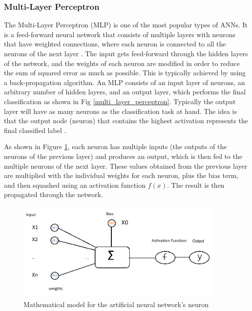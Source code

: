 \documentclass[extern,palatino]{cgMA}
\begin{document}
\subsubsection{Multi-Layer Perceptron} 

The Multi-Layer Perceptron (MLP) is one of the most popular types of ANNs. It is a feed-forward neural network that consists of multiple layers with neurons that have weighted connections, where each neuron is connected to all the neurons of the next layer \cite{noriega2005multilayer}. The input gets feed-forward through the hidden layers of the network, and the weights of each neuron are modified in order to reduce the sum of squared error as much as possible.  This is typically achieved by using a back-propagation algorithm. An MLP consists of an input layer of neurons, an arbitrary number of hidden layers, and an output layer, which performs the final classification as shown in Fig \ref{multi_layer_perceptron}. Typically the output layer will have as many neurons as the classification task at hand. The idea is that the output node (neuron) that contains the highest activation represents the final classified label \cite{ramchoun2016multilayer}. 

As shown in Figure \ref{ann_mathematical_model}, each neuron has multiple inputs (the outputs of the neurons of the previous layer) and produces an output, which is then fed to the multiple neurons of the next layer. These values obtained from the previous layer are multiplied with the individual weights for each neuron, plus the bias term, and then squashed using an activation function $f(x)$. The result is then propagated through the network. 

\begin{figure}[h]
\center
\includegraphics[height={140pt}, width={290pt}]{images/ann_mathematical_model.png}
\caption{Mathematical model for the artificial neural network's neuron}
\label{ann_mathematical_model}
\end{figure}
\end{document}
